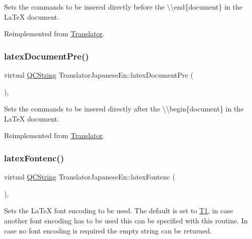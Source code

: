 Sets the commands to be insered directly before the {\ttfamily \textbackslash{}\textbackslash{}end\{document\}} in the La\+TeX document. 

Reimplemented from \mbox{\hyperlink{class_translator_a4bcba7a46f227760b534b35760688da6}{Translator}}.

\mbox{\label{class_translator_japanese_en_a33a1f40ad9680e0277b0d47bb40af96e}} 
\subsubsection{\texorpdfstring{latexDocumentPre()}{latexDocumentPre()}}
{\footnotesize\ttfamily virtual \mbox{\hyperlink{class_q_c_string}{Q\+C\+String}} Translator\+Japanese\+En\+::latex\+Document\+Pre (\begin{DoxyParamCaption}{ }\end{DoxyParamCaption})\hspace{0.3cm}{\ttfamily [inline]}, {\ttfamily [virtual]}}

Sets the commands to be insered directly after the {\ttfamily \textbackslash{}\textbackslash{}begin\{document\}} in the La\+TeX document. 

Reimplemented from \mbox{\hyperlink{class_translator_a9fe33a516bc0ec6825a967294dd5d686}{Translator}}.

\mbox{\label{class_translator_japanese_en_a591b9073a3c3b05b85bc2dbb5f0f2436}} 
\subsubsection{\texorpdfstring{latexFontenc()}{latexFontenc()}}
{\footnotesize\ttfamily virtual \mbox{\hyperlink{class_q_c_string}{Q\+C\+String}} Translator\+Japanese\+En\+::latex\+Fontenc (\begin{DoxyParamCaption}{ }\end{DoxyParamCaption})\hspace{0.3cm}{\ttfamily [inline]}, {\ttfamily [virtual]}}

Sets the La\+TeX font encoding to be used. The default is set to {\ttfamily \mbox{\hyperlink{class_t1}{T1}}}, in case another font encoding has to be used this can be specified with this routine. In case no font encoding is required the empty string can be returned. 

